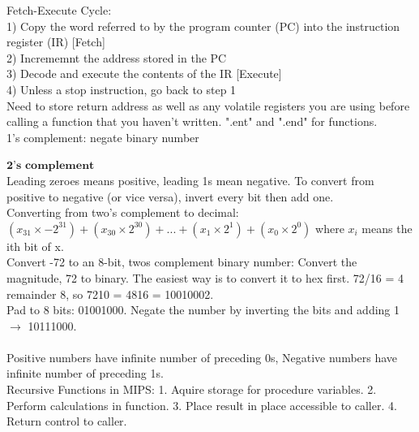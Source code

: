 \documentclass{article}
\begin{document}
Fetch-Execute Cycle: \\
1) Copy the word referred to by the program counter (PC) into the instruction
register (IR) [Fetch] \\
2) Incrememnt the address stored in the PC \\
3) Decode and execute the contents of the IR [Execute] \\
4) Unless a stop instruction, go back to step 1\\

  
  Need to store return address as well as any volatile registers you are using
  before calling a function that you haven't written. ".ent" and ".end" for
  functions. \\
  1's complement: negate binary number 

  $\textbf{2's complement}$ \\
  Leading zeroes means positive, leading 1s mean negative. To convert from
  positive to negative (or vice versa), invert every bit then add one.\\
  Converting from two’s complement to
  decimal: $(x_{31} \times - 2^{31})+ (x_{30}\times 2 ^{30})+... +(x_1 \times
  2^1) + (x_0 \times 2^0)$ where $x_i$ means the ith bit of x. \\
  Convert -72 to an 8-bit, twos complement binary number: 
  Convert the magnitude, 72 to binary. The easiest way is to convert it to hex
  first. 72/16 = 4 remainder 8, so 7210 = 4816 = 10010002. \\
  Pad to 8 bits: 01001000. Negate the number by inverting the bits and adding 1
  $\to$ 10111000.\\~\\
  Positive numbers have infinite number of preceding 0s, Negative numbers have
  infinite number of preceding 1s. \\
  Recursive Functions in MIPS: 1. Aquire storage for procedure variables. 2.
  Perform calculations in function. 3. Place result in place accessible to
  caller. 4. Return control to caller.\\
\end{document}
